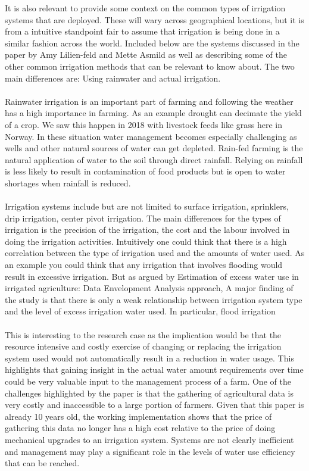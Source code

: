 \documentclass[]{uiophd}
\begin{document}
It is also relevant to provide some context on the common types of irrigation systems that are deployed. These will wary across geographical locations, but it is from a intuitive standpoint fair to assume that irrigation is being done in a similar fashion across the world. Included below are the systems discussed in the paper by  Amy Lilien-feld and Mette Asmild as well as describing some of the  other common irrigation methods that can be relevant to know about. The two main differences are: Using rainwater and actual irrigation. 
\\\\
Rainwater irrigation is an important part of farming and following the weather has a high importance in farming. As an example drought can decimate the yield of a crop. We saw this happen in 2018 with livestock feeds like grass here in Norway. In these situation water management becomes especially challenging as wells and other natural sources of water can get depleted. Rain-fed farming is the natural application of water to the soil through direct rainfall. Relying on rainfall is less likely to result in contamination of food products but is open to water shortages when rainfall is reduced. \cite{cdc}
\\\\
Irrigation systems include but are not limited to surface irrigation, sprinklers, drip irrigation, center pivot irrigation. The main differences for the types of irrigation is the precision of the irrigation, the cost and the labour involved in doing the irrigation activities. Intuitively one could think that there is a high correlation between the type of irrigation used and the amounts of water used. As an example you could think that any irrigation that involves flooding would result in excessive irrigation. But as argued by Estimation of excess water use in irrigated agriculture: Data Envelopment Analysis approach, A major finding of the study is that there is only a weak relationship between irrigation system type and the level of excess irrigation water used. In particular, flood irrigation \cite{LILIENFELD200773}
\\\\
This is interesting to the research case as the implication would be that the resource intensive and costly exercise of changing or replacing the irrigation system used would not automatically result in a reduction in water usage. This highlights that gaining insight in the actual water amount requirements over time could be very valuable input to the management process of a farm. One of  the challenges highlighted by the paper \cite{LILIENFELD200773} is that the gathering of agricultural data is very costly and inaccessible to a large portion of farmers. Given that this paper is already 10 years old, the working implementation shows that the price of gathering this data no longer has a high cost relative to the price of doing mechanical upgrades to an irrigation system. Systems are not clearly inefficient and management may play a significant role in the levels of water use efficiency that can be reached. \cite{LILIENFELD200773}
\end{document}
